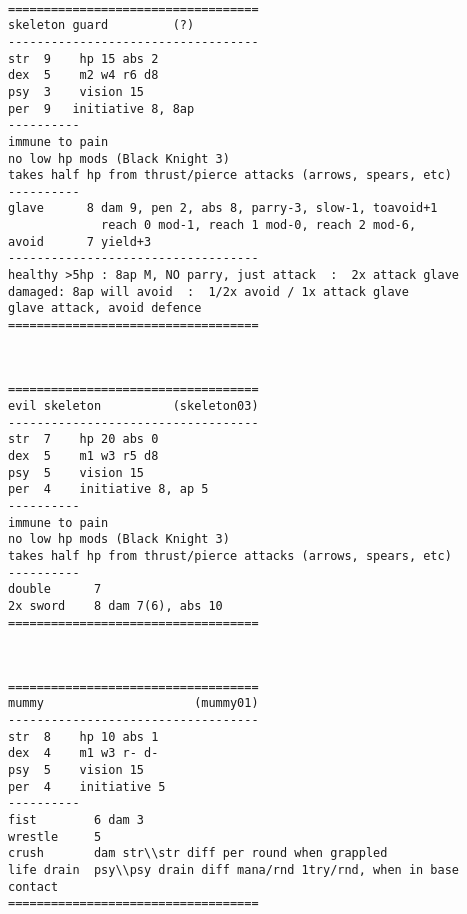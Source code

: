 \

\goodbreak \begin{samepage} \small \begin{verbatim}
===================================
skeleton guard         (?)
-----------------------------------
str  9    hp 15 abs 2
dex  5    m2 w4 r6 d8
psy  3    vision 15
per  9   initiative 8, 8ap
----------
immune to pain
no low hp mods (Black Knight 3)
takes half hp from thrust/pierce attacks (arrows, spears, etc)
----------
glave      8 dam 9, pen 2, abs 8, parry-3, slow-1, toavoid+1
             reach 0 mod-1, reach 1 mod-0, reach 2 mod-6,
avoid      7 yield+3
-----------------------------------
healthy >5hp : 8ap M, NO parry, just attack  :  2x attack glave
damaged: 8ap will avoid  :  1/2x avoid / 1x attack glave
glave attack, avoid defence
===================================
\end{verbatim} \normalsize \end{samepage}

\

\goodbreak \begin{samepage} \small \begin{verbatim}
===================================
evil skeleton          (skeleton03)
-----------------------------------
str  7    hp 20 abs 0
dex  5    m1 w3 r5 d8
psy  5    vision 15
per  4    initiative 8, ap 5
----------
immune to pain
no low hp mods (Black Knight 3)
takes half hp from thrust/pierce attacks (arrows, spears, etc)
----------
double      7
2x sword    8 dam 7(6), abs 10
===================================
\end{verbatim} \normalsize \end{samepage}

\

\goodbreak \begin{samepage} \small \begin{verbatim}
===================================
mummy                     (mummy01)
-----------------------------------
str  8    hp 10 abs 1
dex  4    m1 w3 r- d-
psy  5    vision 15
per  4    initiative 5
----------
fist        6 dam 3
wrestle     5
crush       dam str\\str diff per round when grappled
life drain  psy\\psy drain diff mana/rnd 1try/rnd, when in base contact
===================================
\end{verbatim} \normalsize \end{samepage}

\

